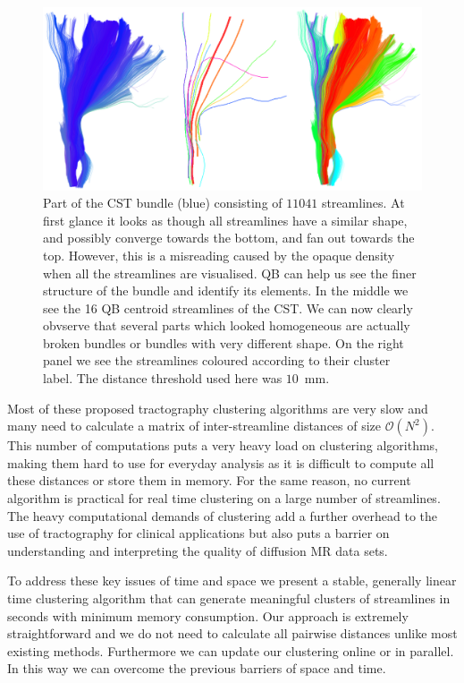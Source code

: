\documentclass{bioinfo}
\begin{document}
%
\begin{figure}[htp]
\centerline{\includegraphics[width=160mm]{Figures/Fig_4_cst_simplification_relabeled_triple.eps}}
\caption{Part of the CST bundle (blue) consisting of $11041$
  streamlines. At first glance it looks as though all streamlines have a
  similar shape, and possibly converge towards the bottom, and fan out
  towards the top. However, this is a misreading caused by the opaque
  density when all the streamlines are visualised.  QB can help us see
  the finer structure of the bundle and identify its elements. In the
  middle we see the 16 QB centroid streamlines of the CST. We can
  now clearly obvserve that several parts which looked homogeneous are
  actually broken bundles or bundles with very different shape. On the
  right panel we see the streamlines coloured according to their cluster
  label. The distance threshold used here was
  $10$~mm. \label{Flo:cst_pbc}}
\end{figure}

Most of these proposed tractography clustering algorithms are very slow
and many need to calculate a matrix of inter-streamline distances of
size $\mathcal{O}(N^2)$.  This number of computations puts a very heavy
load on clustering algorithms, making them hard to use for everyday
analysis as it is difficult to compute all these distances or store them
in memory. For the same reason, no current algorithm is practical for
real time clustering on a large number of streamlines. The heavy
computational demands of clustering add a further overhead to the use of
tractography for clinical applications but also puts a barrier on
understanding and interpreting the quality of diffusion MR data sets.

To address these key issues of time and space we present a stable,
generally linear time clustering algorithm that can generate meaningful
clusters of streamlines in seconds with minimum memory consumption. Our
approach is extremely straightforward and we do not need to calculate
all pairwise distances unlike most existing methods. Furthermore we can
update our clustering online or in parallel. In this way we can overcome
the previous barriers of space and time.
\end{document}

